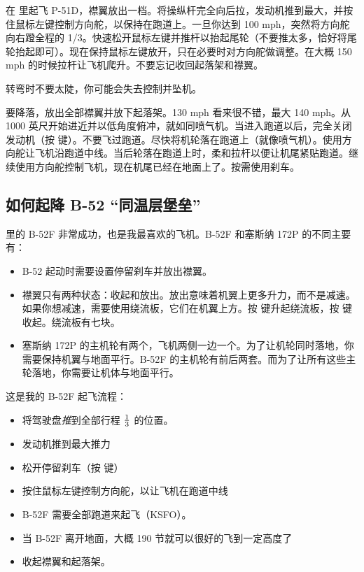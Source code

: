 \begin{itemize}
在 \FlightGear{} 里起飞 P-51D，襟翼放出一档。将操纵杆完全向后拉，发动机推到最大，并按住鼠标左键控制方向舵，以保持在跑道上。一旦你达到 100 mph，突然将方向舵向右蹬全程的 1/3。快速松开鼠标左键并推杆以抬起尾轮（不要推太多，恰好将尾轮抬起即可）。现在保持鼠标左键放开，只在必要时对方向舵做调整。在大概 150 mph 的时候拉杆让飞机爬升。不要忘记收回起落架和襟翼。

转弯时不要太陡，你可能会失去控制并坠机。

要降落，放出全部襟翼并放下起落架。130 mph 看来很不错，最大 140 mph。从 1000 英尺开始进近并以低角度俯冲，就如同喷气机。当进入跑道以后，完全关闭发动机（按 \key{\{} 键）。不要飞过跑道。尽快将机轮落在跑道上（就像喷气机）。使用方向舵让飞机沿跑道中线。当后轮落在跑道上时，柔和拉杆以便让机尾紧贴跑道。继续使用方向舵控制飞机，现在机尾已经在地面上了。按需使用刹车。

\subsection{如何起降 B-52 “同温层堡垒”}
    \label{sec:B52}

\FlightGear{} 里的 B-52F 非常成功，也是我最喜欢的飞机。B-52F 和塞斯纳 172P 的不同主要有：
\begin{itemize}
    \item B-52 起动时需要设置停留刹车并放出襟翼。
    \item 襟翼只有两种状态：收起和放出。放出意味着机翼上更多升力，而不是减速。如果你想减速，需要使用绕流板，它们在机翼上方。按  键升起绕流板，按  键收起。绕流板有七块。
    \item 塞斯纳 172P 的主机轮有两个，飞机两侧一边一个。为了让机轮同时落地，你需要保持机翼与地面平行。B-52F 的主机轮有前后两套。而为了让所有这些主轮落地，你需要让机体与地面平行。
 \end{itemize}

这是我的 B-52F 起飞流程：
\begin{itemize}
    \item 将驾驶盘\emph{推}到全部行程 $1\over3$ 的位置。
    \item 发动机推到最大推力
    \item 松开停留刹车（按  键）
    \item 按住鼠标左键控制方向舵，以让飞机在跑道中线
    \item B-52F 需要全部跑道来起飞（KSFO）。
    \item 当 B-52F 离开地面，大概 190 节就可以很好的飞到一定高度了
    \item 收起襟翼和起落架。
\end{itemize}


\end{itemize}
